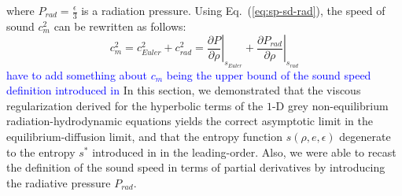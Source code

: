 \documentclass[review]{elsarticle}
\newcommand{\eqt}[1]{Eq.~(\ref{#1})}                     %
\newcommand{\tcb}[1]{\textcolor{blue}{#1}}
\begin{document}
%  
where $P_{rad} = \frac{\epsilon}{3}$ is a radiation pressure. Using \eqt{eq:sp-sd-rad}, the speed of sound $c_m^2$ can be rewritten as follows:
%
\begin{equation}
c_m^2 = c_{Euler}^2 + c_{rad}^2 = \left. \frac{\partial P}{\partial \rho} \right|_{s_{Euler}} + \left. \frac{\partial P_{rad}}{\partial \rho} \right|_{s_{rad}}
\end{equation} 
\tcb{have to add something about $c_m$ being the upper bound of the sound speed definition introduced in \cite{LowrieMorel}}
In this section, we demonstrated that the viscous regularization derived for the hyperbolic terms of the $1$-D grey non-equilibrium radiation-hydrodynamic equations yields the correct asymptotic limit in the equilibrium-diffusion limit, and that the entropy function $s(\rho, e, \epsilon)$ degenerate to the entropy $s^*$ introduced in \cite{LowrieMorel} in the leading-order. Also, we were able to recast the definition of the sound speed in terms of partial derivatives by introducing the radiative pressure $P_{rad}$.

\end{document}
